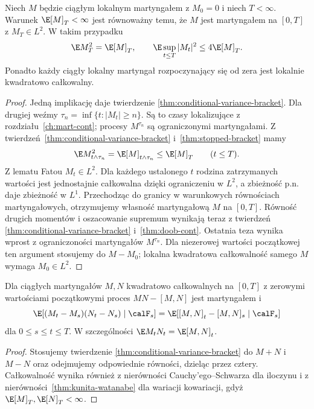 \begin{twierdzenie}
\label{thm:bracket-l2-criterion}
Niech $M$ będzie ciągłym lokalnym martyngałem
z $M_0=0$ i niech $T<\infty$.
Warunek $\E[M]_T<\infty$ jest równoważny temu,
że $M$ jest martyngałem na $[0,T]$ z $M_T\in L^2$.
W takim przypadku
\[
\E M_T^2=\E[M]_T,\qquad
\E\sup_{t\le T}|M_t|^2\le4\E[M]_T.
\]
Ponadto każdy ciągły lokalny martyngał rozpoczynający
się od zera jest lokalnie kwadratowo całkowalny.
\end{twierdzenie}
\begin{proof}
Jedną implikację daje twierdzenie
\ref{thm:conditional-variance-bracket}.
Dla drugiej weźmy
$\tau_n=\inf\{t:|M_t|\ge n\}$.
Są to czasy lokalizujące z rozdziału~\ref{ch:mart-cont};
procesy $M^{\tau_n}$ są ograniczonymi martyngałami.
Z twierdzeń~\ref{thm:conditional-variance-bracket}
i~\ref{thm:stopped-bracket} mamy
\[
\E M_{t\wedge\tau_n}^2
=\E[M]_{t\wedge\tau_n}\le\E[M]_T
\qquad (t\le T).
\]
Z lematu Fatou $M_t\in L^2$. Dla każdego ustalonego $t$
rodzina zatrzymanych wartości jest jednostajnie
całkowalna dzięki ograniczeniu w $L^2$, a zbieżność
p.n. daje zbieżność w $L^1$. Przechodząc do granicy
w warunkowych równościach martyngałowych,
otrzymujemy własność martyngałową $M$ na $[0,T]$.
Równość drugich momentów i oszacowanie supremum
wynikają teraz z twierdzeń
\ref{thm:conditional-variance-bracket}
i~\ref{thm:doob-cont}.
Ostatnia teza wynika wprost z ograniczoności
martyngałów $M^{\tau_n}$.
Dla niezerowej wartości początkowej ten argument
stosujemy do $M-M_0$; lokalna kwadratowa
całkowalność samego $M$ wymaga $M_0\in L^2$.
\end{proof}

\begin{wniosek}
\label{cor:conditional-cross-bracket}
Dla ciągłych martyngałów $M,N$ kwadratowo
całkowalnych na $[0,T]$ z zerowymi wartościami
początkowymi proces $MN-[M,N]$ jest martyngałem i
\[
\E[(M_t-M_s)(N_t-N_s)\mid\calF_s]
=\E[[M,N]_t-[M,N]_s\mid\calF_s]
\]
dla $0\le s\le t\le T$. W szczególności
$\E M_tN_t=\E[M,N]_t$.
\end{wniosek}
\begin{proof}
Stosujemy twierdzenie
\ref{thm:conditional-variance-bracket}
do $M+N$ i $M-N$ oraz odejmujemy
odpowiednie równości, dzieląc przez cztery.
Całkowalność wynika również z nierówności
Cauchy'ego--Schwarza dla iloczynu i z
nierówności~\ref{thm:kunita-watanabe} dla wariacji
kowariacji, gdyż $\E[M]_T,\E[N]_T<\infty$.
\end{proof}

